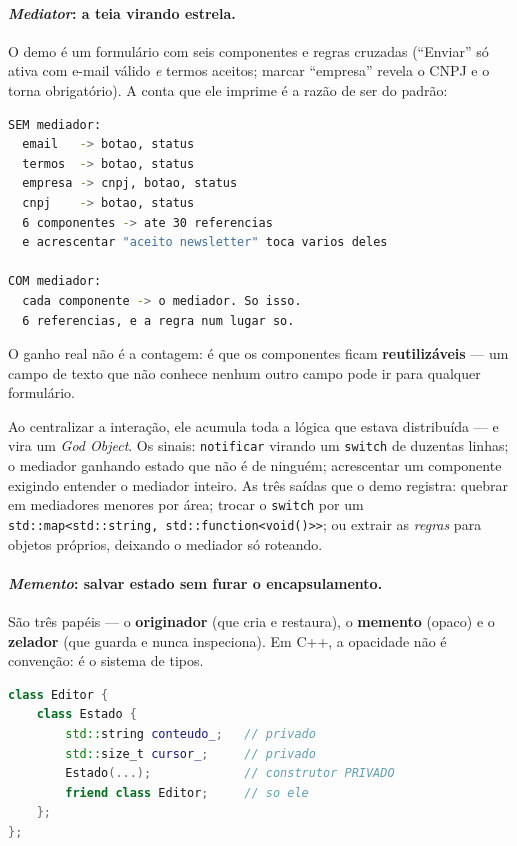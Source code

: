 \paragraph{\emph{Mediator}: a teia virando estrela.} O demo é um formulário com
seis componentes e regras cruzadas (``Enviar'' só ativa com e-mail válido
\emph{e} termos aceitos; marcar ``empresa'' revela o CNPJ e o torna
obrigatório). A conta que ele imprime é a razão de ser do padrão:

\begin{lstlisting}[style=bt, language=bash,
    caption={Saída de \texttt{dist/bin/mediator}, seção 1: quem conhece quem.}]
SEM mediador:
  email   -> botao, status
  termos  -> botao, status
  empresa -> cnpj, botao, status
  cnpj    -> botao, status
  6 componentes -> ate 30 referencias
  e acrescentar "aceito newsletter" toca varios deles

COM mediador:
  cada componente -> o mediador. So isso.
  6 referencias, e a regra num lugar so.
\end{lstlisting}

O ganho real não é a contagem: é que os componentes ficam \textbf{reutilizáveis}
--- um campo de texto que não conhece nenhum outro campo pode ir para qualquer
formulário.

\begin{armadilha}
Ao centralizar a interação, ele acumula toda a lógica que estava distribuída ---
e vira um \emph{God Object}. Os sinais: \texttt{notificar} virando um
\texttt{switch} de duzentas linhas; o mediador ganhando estado que não é de
ninguém; acrescentar um componente exigindo entender o mediador inteiro. As três
saídas que o demo registra: quebrar em mediadores menores por área; trocar o
\texttt{switch} por um \texttt{std::map<std::string, std::function<void()>>};
ou extrair as \emph{regras} para objetos próprios, deixando o mediador só
roteando.
\end{armadilha}

\paragraph{\emph{Memento}: salvar estado sem furar o encapsulamento.} São três
papéis --- o \textbf{originador} (que cria e restaura), o \textbf{memento}
(opaco) e o \textbf{zelador} (que guarda e nunca inspeciona). Em C++, a
opacidade não é convenção: é o sistema de tipos.

\begin{lstlisting}[style=bt, language=C++,
    caption={De \texttt{src/design-of-pattern/memento/}: a opacidade construída
             com classe aninhada privada e \texttt{friend}.}]
class Editor {
    class Estado {
        std::string conteudo_;   // privado
        std::size_t cursor_;     // privado
        Estado(...);             // construtor PRIVADO
        friend class Editor;     // so ele
    };
};
\end{lstlisting}

